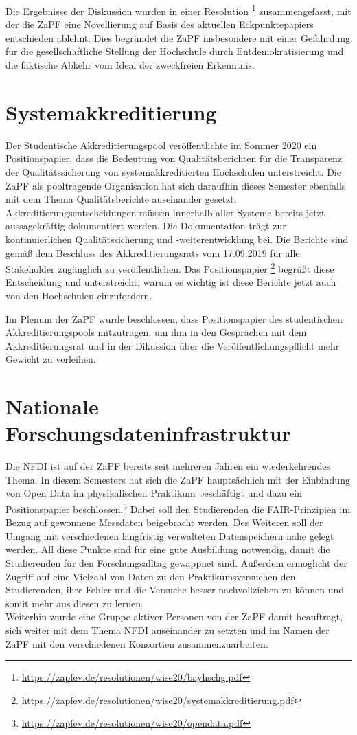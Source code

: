 \documentclass{scrartcl}
\begin{document}
Die Ergebnisse der Diskussion wurden in einer Resolution \footnote{\url{https://zapfev.de/resolutionen/wise20/bayhschg.pdf}} zusammengefasst, mit der die ZaPF eine Novellierung auf Basis des aktuellen Eckpunktepapiers entschieden ablehnt. Dies begründet die ZaPF insbesondere mit einer Gefährdung für die gesellschaftliche Stellung der Hochschule durch Entdemokratisierung und die faktische Abkehr vom Ideal der zweckfreien Erkenntnis.

\section*{Systemakkreditierung}

Der Studentische Akkreditierungspool veröffentlichte im Sommer 2020 ein Positionspapier, dass die Bedeutung von Qualitätsberichten für die Transparenz der Qualitätssicherung von systemakkreditierten Hochschulen unterstreicht. Die ZaPF als pooltragende Organisation hat sich daraufhin dieses Semester ebenfalls mit dem Thema Qualitätsberichte auseinander gesetzt. \\
Akkreditierungsentscheidungen müssen innerhalb aller Systeme bereits jetzt aussagekräftig dokumentiert werden. Die Dokumentation trägt zur kontinuierlichen Qualitätssicherung und -weiterentwicklung bei. Die Berichte sind gemäß dem Beschluss des Akkreditierungsrats vom 17.09.2019 für alle Stakeholder zugänglich zu veröffentlichen. Das Positionspapier \footnote{\url{https://zapfev.de/resolutionen/wise20/systemakkreditierung.pdf}} begrüßt diese Entscheidung und unterstreicht, warum es wichtig ist diese Berichte jetzt auch von den Hochschulen einzufordern.

Im Plenum der ZaPF wurde beschlossen, dass Positionspapier des studentischen Akkreditierungspools mitzutragen, um ihm in den Gesprächen mit dem Akkreditierungsrat und in der Dikussion über die Veröffentlichungspflicht mehr Gewicht zu verleihen.

\section*{Nationale Forschungsdateninfrastruktur}

Die NFDI ist auf der ZaPF bereits seit mehreren Jahren ein wiederkehrendes Thema. In diesem Semesters hat sich die ZaPF hauptsächlich mit der Einbindung von Open Data im physikalischen Praktikum beschäftigt und dazu ein Positionspapier beschlossen.\footnote{\url{https://zapfev.de/resolutionen/wise20/opendata.pdf}} Dabei soll den Studierenden die FAIR-Prinzipien im Bezug auf gewonnene Messdaten beigebracht werden. Des Weiteren soll der Umgang mit verschiedenen langfristig verwalteten Datenspeichern nahe gelegt werden. All diese Punkte sind für eine gute Ausbildung notwendig, damit die Studierenden für den Forschungsalltag gewappnet sind. Außerdem ermöglicht der Zugriff auf eine Vielzahl von Daten zu den Praktikumsversuchen den Studierenden, ihre Fehler und die Versuche besser nachvollziehen zu können und somit mehr aus diesen zu lernen.\\
Weiterhin wurde eine Gruppe aktiver Personen von der ZaPF damit beauftragt, sich weiter mit dem Thema NFDI auseinander zu setzten und im Namen der ZaPF mit den verschiedenen Konsortien zusammenzuarbeiten. 
\end{document}
